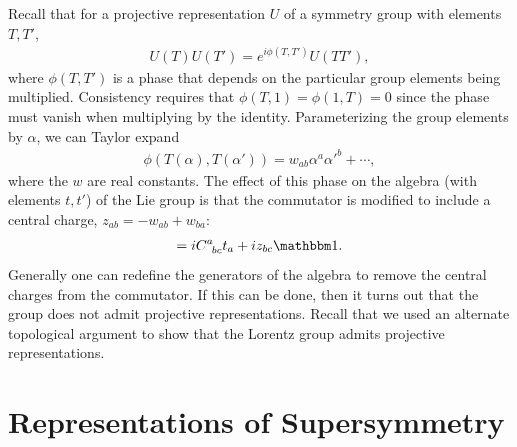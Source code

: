 \documentclass[12pt, oneside]{report}    %
\let\oldsection\section
\def\section{%
  \setcounter{sidenote}{1}%
  \oldsection
}
\begin{document}
\begin{example} Recall that for a projective representation $U$ of a symmetry group with elements $T,T'$,
    \begin{align}
        U(T)U(T') = e^{i\phi(T,T')}U(TT'),
    \end{align}
    where $\phi(T,T')$ is a phase that depends on the particular group elements being multiplied. Consistency requires that $\phi(T,1)=\phi(1,T)=0$ since the phase must vanish when multiplying by the identity. Parameterizing the group elements by $\alpha$, we can Taylor expand
    \begin{align}
        \phi(T(\alpha),T(\alpha')) = w_{ab}\alpha^a\alpha'^b+\cdots,
    \end{align}
    where the $w$ are real constants. The effect of this phase on the algebra (with elements $t,t'$) of the Lie group is that the commutator is modified to include a central charge, $z_{ab} = -w_{ab}+w_{ba}$:
    \begin{align}
        [t_b,t_c] = iC^a_{\phantom abc}t_a + iz_{bc}\mathbbm 1.
    \end{align}
    Generally one can redefine the generators of the algebra to remove the central charges from the commutator. If this can be done, then it turns out that the group does not admit projective representations. Recall that we used an alternate topological argument to show that the Lorentz group admits projective representations.
\end{example}



\section{Representations of Supersymmetry}
\label{chap:SUSYreps}


\end{document}
